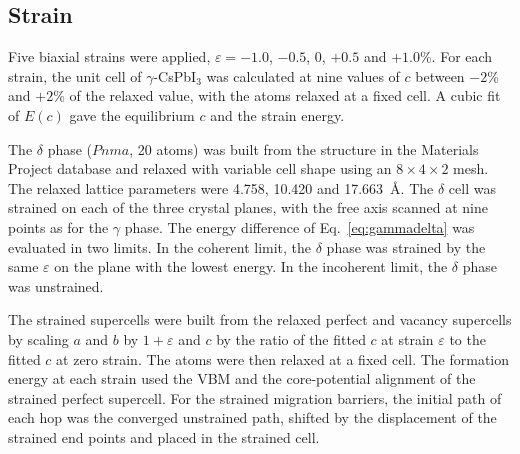 \subsection{Strain}

Five biaxial strains were applied, $\varepsilon = -1.0$, $-0.5$, 0, $+0.5$ and $+1.0$\%. For each strain, the unit cell of $\gamma$-CsPbI$_3$ was calculated at nine values of $c$ between $-2$\% and $+2$\% of the relaxed value, with the atoms relaxed at a fixed cell. A cubic fit of $E(c)$ gave the equilibrium $c$ and the strain energy.

The $\delta$ phase ($Pnma$, 20 atoms) was built from the structure in the Materials Project database \citep{Jain2013} and relaxed with variable cell shape using an $8\times4\times2$ mesh. The relaxed lattice parameters were 4.758, 10.420 and 17.663~\AA. The $\delta$ cell was strained on each of the three crystal planes, with the free axis scanned at nine points as for the $\gamma$ phase. The energy difference of Eq.~\ref{eq:gammadelta} was evaluated in two limits. In the coherent limit, the $\delta$ phase was strained by the same $\varepsilon$ on the plane with the lowest energy. In the incoherent limit, the $\delta$ phase was unstrained.

The strained supercells were built from the relaxed perfect and vacancy supercells by scaling $a$ and $b$ by $1+\varepsilon$ and $c$ by the ratio of the fitted $c$ at strain $\varepsilon$ to the fitted $c$ at zero strain. The atoms were then relaxed at a fixed cell. The formation energy at each strain used the VBM and the core-potential alignment of the strained perfect supercell. For the strained migration barriers, the initial path of each hop was the converged unstrained path, shifted by the displacement of the strained end points and placed in the strained cell.
